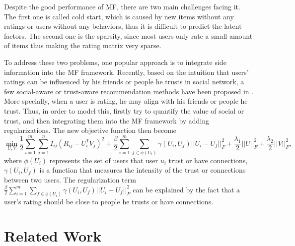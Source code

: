 \documentclass[10pt,onecolumn,conference]{IEEEtran}
\begin{document}
Despite the good performance of MF, there are two main challenges facing it. The first one is called cold start, which is caused by new items without any ratings or users without any behaviors, thus it is difficult to predict the latent factors. The second one is the sparsity, since most users only rate a small amount of items thus making the rating matrix very sparse.

To address these two problems, one popular approach is to integrate side information into the MF framework. Recently, based on the intuition that users' ratings can be influenced by his friends or people he trusts in social network, a few social-aware or trust-aware recommendation methods have been proposed in \cite{jamali2010matrix}\cite{ma2009llearningEnsembel}\cite{ma2009learningTrust}\cite{ma2008sorec}\cite{ma2011recommender}\cite{massa2004trust}\cite{yang2013social}. More specially, when a user is rating, he may align with his friends or people he trust. Thus, in order to model this, \cite{jamali2010matrix}\cite{ma2009llearningEnsembel}\cite{ma2009learningTrust}\cite{ma2008sorec}\cite{ma2011recommender}\cite{massa2004trust} firstly try to quantify the value of social or trust, and then integrating them into the MF framework by adding regularizations. The new objective function then become
\begin{equation}
\min_{U,V}\frac{1}{2}\sum_{i=1}^{m}\sum_{j=1}^{n}I_{ij}(R_{ij} - U_i^TV_j)^2 + \frac{\beta}{2}\sum_{i=1}^{m}\sum_{f \in \phi(U_i)}\gamma(U_i, U_f)||U_i - U_f||_F^2 + \frac{\lambda_1}{2}||U||_F^2 + \frac{\lambda_2}{2}||V||_F^2,
\end{equation} 
where $\phi(U_i)$ represents the set of users that user $u_i$ trust or have connections, $\gamma(U_i,U_f)$ is a function that measures the intensity of the trust or connections between two users. The regularization term $\frac{\beta}{2}\sum_{i=1}^{m}\sum_{f \in \phi(U_i)}\gamma(U_i, U_f)||U_i - U_f||_F^2$ can be explained by the fact that a user's rating should be close to people he trusts or have connections.

\section{Related Work}
\end{document}
